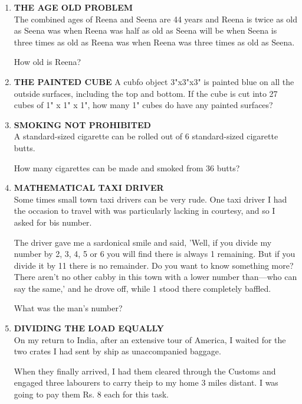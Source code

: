 \documentclass[12pt]{article}
\begin{document}
\begin{enumerate}
\item \textbf{THE  AGE  OLD  PROBLEM} \\
The combined  ages  of Reena  and  Seena  are  44 years and Reena  is twice  as old as Seena  was  when  Reena  was half as old as Seena  will be when  Seena  is three  times  as old as Reena  was  when  Reena  was  three  times  as old  as Seena. 

How  old is Reena? 


\item \textbf{THE  PAINTED  CUBE} 
A cubfo  object  3"x3"x3"  is painted  blue  on  all the outside  surfaces,  including  the  top  and  bottom.  If the cube  is cut into  27 cubes  of 1" x 1" x 1", how  many 1" cubes  do have  any painted  surfaces? 


\item \textbf{SMOKING  NOT  PROHIBITED} \\ 
A standard-sized  cigarette  can  be  rolled  out  of 6 standard-sized  cigarette  butts.  

How  many  cigarettes  can be made  and smoked  from  36 butts? 



\item \textbf{MATHEMATICAL  TAXI  DRIVER} \\ 
Some  times  small  town  taxi  drivers  can  be  very rude.  One  taxi  driver  I had the occasion  to travel  with was particularly  lacking  in courtesy,  and  so I asked  for bis number. 

The driver  gave  me a sardonical  smile  and said,  'Well, if you  divide  my number  by 2, 3, 4, 5 or 6 you  will  find there  is always  1 remaining.  But  if you  divide  it by 11 there  is no remainder.  Do  you  want  to know  something more?  There  aren't  no other  cabby  in this  town  with  a lower  number  than—who  can say the same,'  and he drove off, while  1 stood  there  completely  baffled. 

What  was  the man's  number? 


\item \textbf{DIVIDING  THE  LOAD  EQUALLY} \\ 
On my  return  to India,  after  an extensive  tour  of America,  I waited  for the two  crates  I had  sent  by ship as unaccompanied  baggage. 

When  they  finally  arrived,  I had them  cleared  through the Customs  and engaged  three  labourers  to carry  theip to my home  3 miles  distant.  I was  going  to pay  them Rs. 8 each  for this task. 


\end{enumerate}
\end{document}
